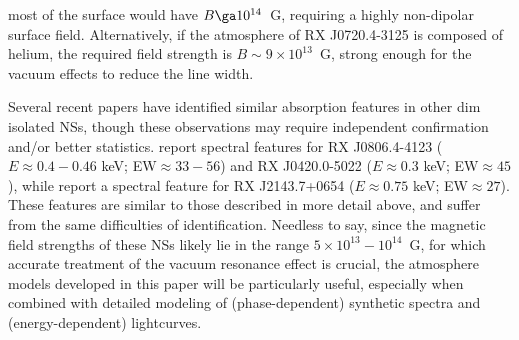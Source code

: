 \documentclass[useAMS,onecolumn,usenatbib,usegraphicx]{mn2e}
\begin{document}
most of the surface would have $B\ga 10^{14}$~G,
requiring a highly non-dipolar surface field.
Alternatively, if the atmosphere of RX J0720.4-3125 is composed of helium, 
the required field strength is $B\sim 9\times 10^{13}$~G, 
strong enough for the vacuum effects to reduce the line width.

Several recent papers have identified similar absorption features in 
other dim isolated NSs, though these observations may require independent 
confirmation and/or better statistics.  \citet[][]{Haberletal04b} report 
spectral features for RX J0806.4-4123 ($E\approx 0.4-0.46$ keV; 
EW$\approx 33-56$) and RX J0420.0-5022 ($E\approx 0.3$ keV; 
EW$\approx 45$), while \citet[][]{Zaneetal05a} report a spectral feature 
for RX J2143.7+0654 ($E\approx 0.75$ keV; EW$\approx 27$).
These features are similar to those described in more 
detail above, and suffer from the same difficulties of identification.  
Needless to say, since the magnetic field strengths of these NSs
likely lie in the range $5\times 10^{13}-10^{14}$~G, for which
accurate treatment of the vacuum resonance effect is crucial,
the atmosphere models developed in this paper will be particularly
useful, especially when combined with detailed modeling of (phase-dependent)
synthetic spectra and (energy-dependent) lightcurves.
\end{document}
